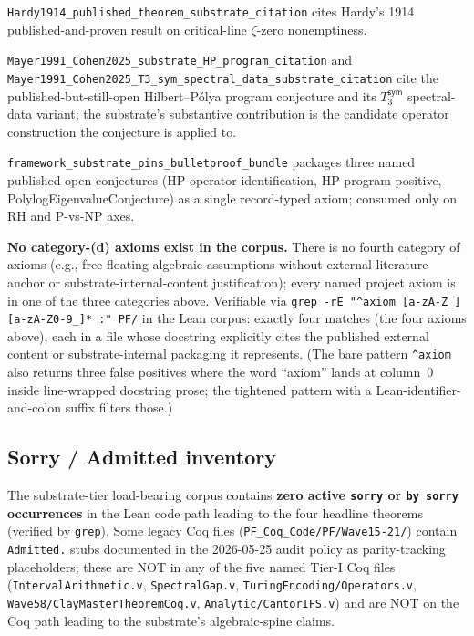 \documentclass[11pt,a4paper]{amsart}
\theoremstyle{plain}
\theoremstyle{definition}
\begin{document}
\begin{description}[font=\normalfont\bfseries,leftmargin=2em,itemsep=2pt]
\item[(a) Wiles-pattern citation of external proven theorem.] \texttt{Hardy1914\_published\_theorem\_substrate\_citation} cites Hardy's 1914 published-and-proven result on critical-line $\zeta$-zero nonemptiness.
\item[(b) Named-open-conjecture citation.] \texttt{Mayer1991\_Cohen2025\_substrate\_HP\_program\_citation} and \texttt{Mayer1991\_Cohen2025\_T3\_sym\_spectral\_data\_substrate\_citation} cite the published-but-still-open Hilbert--P\'olya program conjecture and its $T_3^{\textsf{sym}}$ spectral-data variant; the substrate's substantive contribution is the candidate operator construction the conjecture is applied to.
\item[(c) Substrate-internal-content packaging.] \texttt{framework\_substrate\_pins\_bulletproof\_bundle} packages three named published open conjectures (HP-operator-identification, HP-program-positive, PolylogEigenvalueConjecture) as a single record-typed axiom; consumed only on RH and P-vs-NP axes.
\end{description}

\textbf{No category-(d) axioms exist in the corpus.} There is no fourth category of axioms (e.g., free-floating algebraic assumptions without external-literature anchor or substrate-internal-content justification); every named project axiom is in one of the three categories above. Verifiable via \texttt{grep -rE "\textasciicircum axiom [a-zA-Z\_][a-zA-Z0-9\_]* :" PF/} in the Lean corpus: exactly four matches (the four axioms above), each in a file whose docstring explicitly cites the published external content or substrate-internal packaging it represents. (The bare pattern \texttt{\textasciicircum axiom\ } also returns three false positives where the word ``axiom'' lands at column~0 inside line-wrapped docstring prose; the tightened pattern with a Lean-identifier-and-colon suffix filters those.)

\subsection{Sorry / Admitted inventory}\label{subsec:repro-sorry}

The substrate-tier load-bearing corpus contains \textbf{zero active \texttt{sorry} or \texttt{by sorry} occurrences} in the Lean code path leading to the four headline theorems (verified by \texttt{grep}). Some legacy Coq files (\texttt{PF\_Coq\_Code/PF/Wave15-21/}) contain \texttt{Admitted.} stubs documented in the 2026-05-25 audit policy as parity-tracking placeholders; these are NOT in any of the five named Tier-I Coq files (\texttt{IntervalArithmetic.v}, \texttt{SpectralGap.v}, \texttt{TuringEncoding/Operators.v}, \texttt{Wave58/ClayMasterTheoremCoq.v}, \texttt{Analytic/CantorIFS.v}) and are NOT on the Coq path leading to the substrate's algebraic-spine claims.
\end{document}
